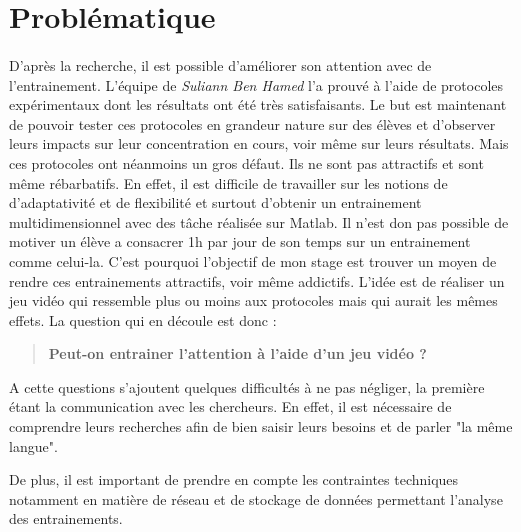 \section{Problématique}

\paragraph{}D'après la recherche, il est possible d'améliorer son attention avec de l'entrainement. L'équipe de \emph{Suliann Ben Hamed} l'a prouvé à l'aide de protocoles expérimentaux
dont les résultats ont été très satisfaisants. Le but est maintenant de pouvoir tester ces protocoles en grandeur nature sur des élèves et d'observer leurs impacts sur leur
concentration en cours, voir même sur leurs résultats. Mais ces protocoles ont néanmoins un gros défaut. Ils ne sont pas attractifs et sont même rébarbatifs. En effet, il est difficile
de travailler sur les notions de d'adaptativité et de flexibilité et surtout d'obtenir un entrainement multidimensionnel avec des tâche réalisée sur \gls{Matlab}. Il n'est don pas
possible de motiver un élève a consacrer 1h par jour de son temps sur un entrainement comme celui-la. C'est pourquoi l'objectif de mon stage est trouver un moyen de rendre ces
entrainements attractifs, voir même addictifs. L'idée est de réaliser un jeu vidéo qui ressemble plus ou moins aux protocoles mais qui aurait les mêmes effets. La question qui en
découle est donc :
\begin{quote}
\textbf{Peut-on entrainer l'attention à l'aide d'un jeu vidéo ?}
\end{quote}

A cette questions s'ajoutent quelques difficultés à ne pas négliger, la première étant la communication avec les chercheurs. En effet, il est nécessaire de comprendre leurs
recherches afin de bien saisir leurs besoins et de parler "la même langue".

De plus, il est important de prendre en compte les contraintes techniques notamment en matière de réseau et de stockage de données permettant l'analyse des entrainements.


\newpage